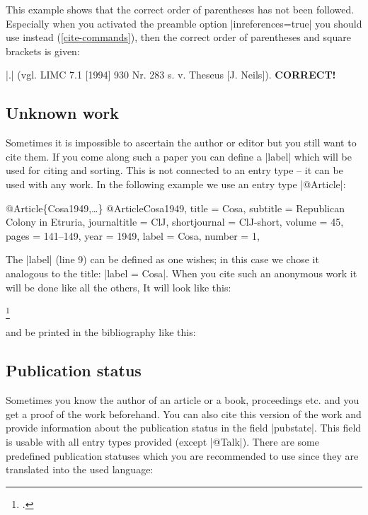 \documentclass[a4paper,
10pt,
greek,
french,
spanish,
italian,
ngerman,
english
]{ltxdoc}
\begin{document}
\DescribeMacro{\parencite} \DescribeMacro{\parencites}
This example shows that the correct order of parentheses has not been followed.
Especially when you activated the preamble option  |inreferences=true|  you should use  instead (\cref{cite-commands}), then the correct order of parentheses and square brackets is given:
\begin{tcolorbox}[examplebox]
|\parencite[vgl.][930 Nr. 283]{Neils1994}.| 
\tcblower
(vgl. LIMC 7.1 [1994] 930 Nr. 283 s. v. Theseus [J. Neils]). \textcolor{green!50!black}{\textbf{CORRECT!}}
\end{tcolorbox}

\subsection{Unknown work}\label{unknown}
Sometimes it is impossible to ascertain the author or editor but you still want to cite them.
If you come along such a paper you can define a |label| which will be used for citing and sorting.
This is not connected to an entry type -- it can be used with any work.
In the following example we use an entry type |@Article|:
\begin{bibexample}[label=Cosa1949]{{@}Article\{Cosa1949,…\}}
@Article{Cosa1949,
  title        = {Cosa},
  subtitle     = {Republican Colony in Etruria},
  journaltitle = ClJ,
  shortjournal = ClJ-short,
  volume       = {45},
  pages        = {141--149},
  year         = {1949},
  label        = {Cosa},
  number       = {1},
}
\end{bibexample}
 The |label| (line 9) can be defined as one wishes; in this case we chose it analogous to the title: |label = {Cosa}|.
When you cite such an anonymous work it will be done like all the others,
 It will look like this:
\begin{example}
\footnote{\cite[Vgl.][145--147]{Cosa1949}.}
\end{example}
and be printed in the bibliography like this:

\subsection{Publication status}
Sometimes you know the author of an article or a book, proceedings etc. and you get a proof of the work beforehand.
You can also cite this version of the work and provide information about the publication status in the field |pubstate|.
This field is usable with all entry types provided (except |@Talk|).
There are some predefined publication statuses which you are recommended to use since they are translated into the used language:
\end{document}
